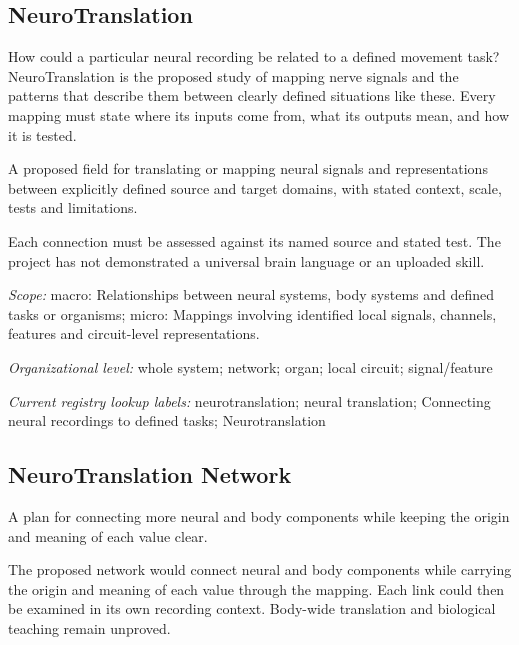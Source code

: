 \begin{samepage}
\subsection*{NeuroTranslation}
\noindent How could a particular neural recording be related to a defined movement task? NeuroTranslation is the proposed study of mapping nerve signals and the patterns that describe them between clearly defined situations like these. Every mapping must state where its inputs come from, what its outputs mean, and how it is tested.\par
\end{samepage}
\noindent A proposed field for translating or mapping neural signals and representations between explicitly defined source and target domains, with stated context, scale, tests and limitations.\par
\noindent Each connection must be assessed against its named source and stated test. The project has not demonstrated a universal brain language or an uploaded skill.\par
\noindent\textit{Scope:} macro: Relationships between neural systems, body systems and defined tasks or organisms; micro: Mappings involving identified local signals, channels, features and circuit-level representations.\par
\begin{samepage}
\noindent\textit{Organizational level:} whole system; network; organ; local circuit; signal/feature\par\nopagebreak[4]
\nopagebreak[4]
\end{samepage}


\noindent\textit{Current registry lookup labels:} neurotranslation; neural translation; Connecting neural recordings to defined tasks; Neurotranslation\par

\begin{samepage}
\subsection*{NeuroTranslation Network}
\noindent A plan for connecting more neural and body components while keeping the origin and meaning of each value clear.\par
\end{samepage}
\begin{samepage}
\noindent The proposed network would connect neural and body components while carrying the origin and meaning of each value through the mapping. Each link could then be examined in its own recording context. Body-wide translation and biological teaching remain unproved.\par\nopagebreak[4]

\end{samepage}


